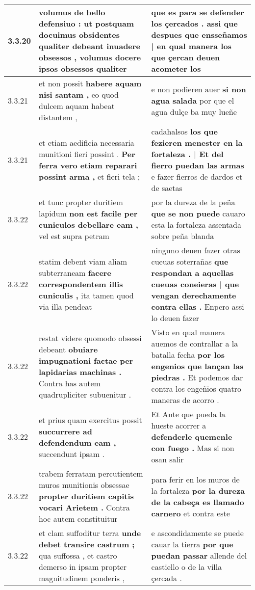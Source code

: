 \begin{tabular}{|p{1cm}|p{6.5cm}|p{6.5cm}|}
3.3.20 & volumus de bello defensiuo : \textbf{ ut postquam docuimus obsidentes qualiter debeant inuadere obsessos , } volumus docere ipsos obsessos qualiter & que es para se defender los çercados . \textbf{ assi que despues que ensseñamos | en qual manera } los que çercan deuen acometer los \\\hline
3.3.21 & et non possit \textbf{ habere aquam nisi santam , } eo quod dulcem aquam habeat distantem , & e non podieren auer \textbf{ si non agua salada } por que el agua dulçe ba muy lueñe \\\hline
3.3.21 & et etiam aedificia necessaria munitioni fieri possint . \textbf{ Per ferra vero etiam reparari possint arma , } et fieri tela ; & cadahalsos \textbf{ los que fezieren menester en la fortaleza . | Et del fierro puedan las armas } e fazer fierros de dardos et de saetas \\\hline
3.3.22 & et tunc propter duritiem lapidum \textbf{ non est facile per cuniculos debellare eam , } vel est supra petram & por la dureza de la peña \textbf{ que se non puede } cauaro esta la fortaleza assentada sobre peña blanda \\\hline
3.3.22 & statim debent viam aliam subterraneam \textbf{ facere correspondentem illis cuniculis , } ita tamen quod via illa pendeat & ninguno deuen fazer otras cueuas soterrañas \textbf{ que respondan a aquellas cueuas coneieras | que vengan derechamente contra ellas . } Enpero assi lo deuen fazer \\\hline
3.3.22 & restat videre quomodo obsessi debeant \textbf{ obuiare impugnationi factae per lapidarias machinas . } Contra has autem quadrupliciter subuenitur . & Visto en qual manera auemos de contrallar a la batalla fecha \textbf{ por los engenios que lançan las piedras . } Et podemos dar contra los engeñios quatro maneras de acorro . \\\hline
3.3.22 & et prius quam exercitus possit \textbf{ succurrere ad defendendum eam , } succendunt ipsam . & Et Ante que pueda la hueste acorrer a \textbf{ defenderle quemenle con fuego . } Mas si non osan salir \\\hline
3.3.22 & trabem ferratam percutientem muros munitionis obsessae \textbf{ propter duritiem capitis vocari Arietem . } Contra hoc autem constituitur & para ferir en los muros de la fortaleza \textbf{ por la dureza de la cabeça es llamado carnero } et contra este \\\hline
3.3.22 & et clam suffoditur terra \textbf{ unde debet transire castrum ; } qua suffossa , et castro demerso in ipsam propter magnitudinem ponderis , & e ascondidamente se puede cauar la tierra \textbf{ por que puedan passar } allende del castiello o de la villa çercada . \\\hline

\end{tabular}
